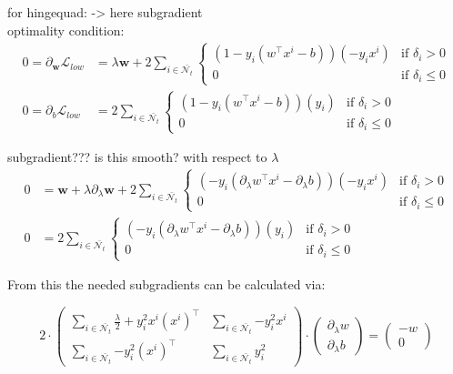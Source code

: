 for hingequad: -> here subgradient \\
optimality condition:
\begin{align}
	0 = \partial_{\bm{w}}\mathcal{L}_{low} &= \lambda \bm{w}+2\sum_{i \in \bar{\mathcal{N}_t}}{\left\{\begin{array}{cl} (1-y_i(w^{\top}x^i-b))(-y_ix^i) & \text{if } \delta_i >0 \\ 0 & \text{if } \delta_i \leq 0 \end{array} \right.} \\
	0 = \partial_b\mathcal{L}_{low} &= 2\sum_{i \in \bar{\mathcal{N}_t}}{\left\{\begin{array}{cl} (1-y_i(w^{\top}x^i-b))(y_i) & \text{if } \delta_i >0 \\ 0 & \text{if } \delta_i \leq 0 \end{array} \right.}
	\end{align}
	
subgradient??? is this smooth? with respect to \(\lambda\)
\begin{align}
	0 &= \bm{w}+\lambda\partial_{\lambda}\bm{w}+2\sum_{i \in \bar{\mathcal{N}_t}}{\left\{\begin{array}{cl} (-y_i(\partial_{\lambda}w^{\top}x^i-\partial_{\lambda}b))(-y_ix^i) & \text{if } \delta_i >0 \\ 0 & \text{if } \delta_i \leq 0 \end{array} \right.} \\
	0 &= 2\sum_{i \in \bar{\mathcal{N}_t}}{\left\{\begin{array}{cl} (-y_i(\partial_{\lambda}w^{\top}x^i-\partial_{\lambda}b))(y_i) & \text{if } \delta_i >0 \\ 0 & \text{if } \delta_i \leq 0 \end{array} \right.}
\end{align}

From this the needed subgradients can be calculated via:

\begin{equation}
	2\cdot\begin{pmatrix} \sum_{i \in \bar{\mathcal{N}_t}}\frac{\lambda}{2}+{y_i^2x^i(x^i)^{\top}} & \sum_{i \in \bar{\mathcal{N}_t}}	{-y_i^2x^i} \\ \sum_{i \in \bar{\mathcal{N}_t}}{-y_i^2(x^i)^{\top}} & \sum_{i \in \bar{\mathcal{N}_t}}{y_i^2}\end{pmatrix}
	\cdot \begin{pmatrix} \partial_{\lambda}w \\ \partial_{\lambda}b\end{pmatrix}
	= \begin{pmatrix}-w \\ 0\end{pmatrix}
\label{subgr_wb}
\end{equation}

